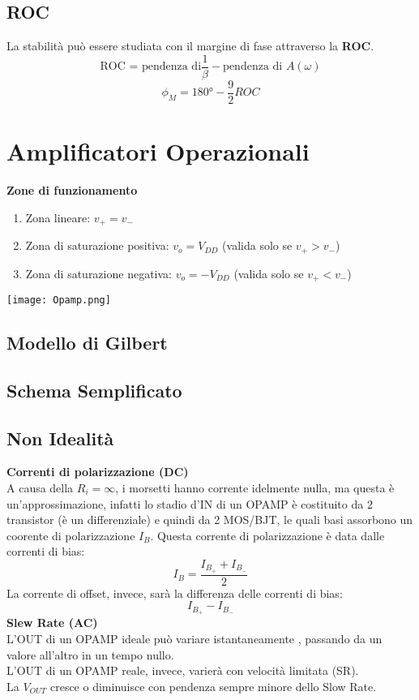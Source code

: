 \documentclass{article}
\begin{document}
\subsection{ROC}
La stabilità può essere studiata con il margine di fase attraverso la \textbf{ROC}.
\begin{equation}
    \mbox {ROC = pendenza di} \frac{1}{\beta} - \mbox{pendenza di }A(\omega) 
\end{equation}
\begin{equation}
    \phi_{M}=180°-\frac{9}{2}ROC
\end{equation}

\newpage
\section{Amplificatori Operazionali}
\textbf{Zone di funzionamento}
\begin{enumerate}
    \item Zona lineare: $v_{+}=v_{-}$
    \item Zona di saturazione positiva: $v_{o}=V_{DD}$ (valida solo se $v_{+}>v_{-}$)
    \item Zona di saturazione negativa: $v_{o}=-V_{DD}$ (valida solo se $v_{+}<v_{-}$)
    \end{enumerate}
\begin{center}
    \texttt{[image: Opamp.png]}
\end{center}
\subsection{Modello di Gilbert}
\subsection{Schema Semplificato}
\subsection{Non Idealità}
\textbf{Correnti di polarizzazione (DC)}\\
A causa della $R_{i}=\infty$, i morsetti hanno corrente idelmente nulla, ma questa è un'approssimazione, infatti lo stadio d'IN di un OPAMP è costituito da 2 transistor (è un differenziale) e quindi da 2 MOS/BJT, le quali basi assorbono un coorente di polarizzazione $I_{B}$.
Questa corrente di polarizzazione è data dalle correnti di bias:
\begin{equation}
    I_{B}=\frac{I_{B_{+}}+I_{B_{-}}}{2}
\end{equation}
La corrente di offset, invece, sarà la differenza delle correnti di bias:
\begin{equation}
    I_{B_{+}}-I_{B_{-}}
\end{equation}
\textbf{Slew Rate (AC)}\\
L'OUT di un OPAMP ideale può variare istantaneamente , passando da un valore all'altro in un tempo nullo.\\
L'OUT di un OPAMP reale, invece, varierà con velocità limitata (SR).\\
La $V_{OUT}$ cresce o diminuisce con pendenza sempre minore dello Slow Rate.
\end{document}
